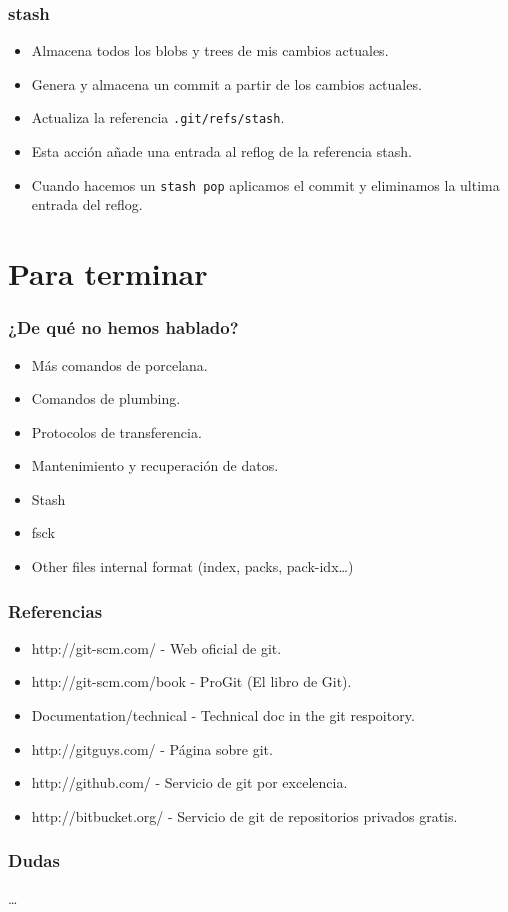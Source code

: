 \documentclass[10pt]{beamer}
\begin{document}
  \begin{frame}[containsverbatim]
    \frametitle{stash}
    \begin{itemize}
      \item Almacena todos los blobs y trees de mis cambios actuales.
      \item Genera y almacena un commit a partir de los cambios actuales.
      \item Actualiza la referencia \verb+.git/refs/stash+.
      \item Esta acción añade una entrada al reflog de la referencia stash.
      \item Cuando hacemos un \verb+stash pop+ aplicamos el commit y eliminamos la ultima entrada del reflog.
    \end{itemize}
  \end{frame}

  \section*{Para terminar}

  \begin{frame}[containsverbatim]
    \frametitle{¿De qué no hemos hablado?}
    \begin{itemize}
        \item Más comandos de porcelana.
        \item Comandos de plumbing.
        \item Protocolos de transferencia.
        \item Mantenimiento y recuperación de datos.
        \item Stash
        \item fsck
        \item Other files internal format (index, packs, pack-idx\dots{})
    \end{itemize}
  \end{frame}

  \begin{frame}[containsverbatim]
    \frametitle{Referencias}
    \begin{itemize}
      \item \small{http://git-scm.com/ - Web oficial de git.}
      \item \small{http://git-scm.com/book - ProGit (El libro de Git).}
      \item \small{Documentation/technical - Technical doc in the git respoitory. }
      \item \small{http://gitguys.com/ - Página sobre git.}
      \item \small{http://github.com/ - Servicio de git por excelencia.}
      \item \small{http://bitbucket.org/ - Servicio de git de repositorios privados gratis.}
    \end{itemize}
  \end{frame}

  \begin{frame}[containsverbatim]
    \frametitle{Dudas}
    \dots
  \end{frame}
\end{document}
